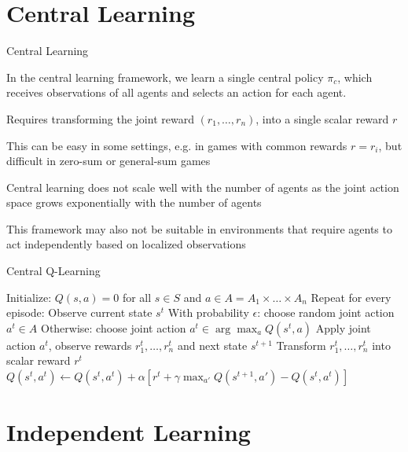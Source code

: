 \section{Central Learning}

\begin{frame}{Central Learning}

In the central learning framework, we learn a single central policy $\pi_c$, which receives observations of all agents and selects an action for each agent. 

\blist
    \item Requires transforming the joint reward $(r_1, \ldots, r_n)$, into a single scalar reward $r$
    \item This can be easy in some settings, e.g. in games with common rewards $r = r_i$, but difficult in zero-sum or general-sum games
    \item Central learning does not scale well with the number of agents as the joint action space grows exponentially with the number of agents
    \item This framework may also not be suitable in environments that require agents to act independently based on localized observations
\elist
\end{frame}

\begin{frame}{Central Q-Learning}


\State Initialize: \( Q(s, a) = 0 \) for all \( s \in S \) and \( a \in A = A_1 \times \ldots \times A_n \)
\State Repeat for every episode:
    \State Observe current state \( s^t \)
    \State With probability \( \epsilon \): choose random joint action \( a^t \in A \)
    \State Otherwise: choose joint action \( a^t \in \arg\max_a Q(s^t, a) \)
    \State Apply joint action \( a^t \), observe rewards \( r_1^t, \ldots, r_n^t \) and next state \( s^{t+1} \)
    \State Transform \( r_1^t, \ldots, r_n^t \) into scalar reward \( r^t \)
    \State \( Q(s^t, a^t) \leftarrow Q(s^t, a^t) + \alpha [ r^t + \gamma \max_{a'} Q(s^{t+1}, a') - Q(s^t, a^t) ] \)
\EndFor
\ealg

\end{frame}

\section{Independent Learning}

